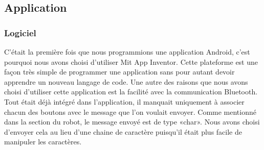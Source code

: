 \subsection{Application}

\subsubsection{Logiciel}

C’était la première fois que nous programmions une application Android, c’est pourquoi nous avons choisi d’utiliser Mit App Inventor.
Cette plateforme est une façon très simple de programmer une application sans pour autant devoir apprendre un nouveau langage de code.
Une autre des raisons que nous avons choisi d’utiliser cette application est la facilité avec la communication Bluetooth.
Tout était déjà intégré dans l’application, il manquait uniquement à associer chacun des boutons avec le message que l’on voulait envoyer.
Comme mentionné dans la section du robot, le message envoyé est de type «char».
Nous avons choisi d’envoyer cela au lieu d’une chaine de caractère puisqu’il était plus facile de manipuler les caractères.
